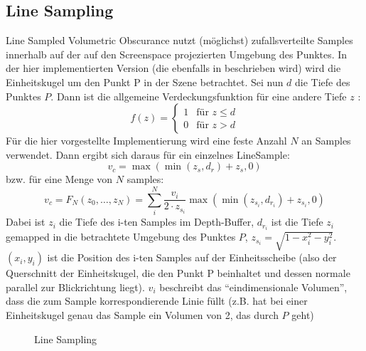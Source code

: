 \documentclass[runningheaders,a4paper]{llncs}
\begin{document}
\subsection{Line Sampling} \label{ssec:LSVO}
Line Sampled Volumetric Obscurance nutzt (möglichst) zufallsverteilte Samples innerhalb auf der auf den
Screenspace projezierten Umgebung des Punktes. In der hier implementierten Version (die ebenfalls in
\cite{voPaper} beschrieben wird) wird die Einheitskugel um den Punkt P in der Szene betrachtet.
Sei nun $d$ die Tiefe des Punktes $P$. Dann ist die allgemeine Verdeckungsfunktion für eine andere Tiefe
$z$ :
$$
f(z) = \begin{cases} 1 &  \text{für } z \leq d \\ 0 & \text{für } z > d \end{cases}
$$
Für die hier vorgestellte Implementierung wird eine feste Anzahl $N$ an Samples verwendet.
Dann ergibt sich daraus für ein einzelnes LineSample:
$$
v_c = \max{(\min{(z_s, d_r)} + z_s, 0)}
$$
bzw. für eine Menge von $N$ samples:
$$
v_c = F_{N}(z_0, \dots, z_N) = \sum_i^N \frac{v_i}{2 \cdot z_{s_i}} \max{(\min{(z_{s_i}, d_{r_i})} + z_{s_i}, 0)}
$$
Dabei ist $z_i$ die Tiefe des i-ten Samples im Depth-Buffer, $d_{r_i}$ ist die Tiefe $z_i$ gemapped in die
betrachtete Umgebung des Punktes $P$, $z_{s_i} = \sqrt{1 - x_i^2 - y_i^2}$. $(x_i, y_i)$ ist die Position des
i-ten Samples auf der Einheitsscheibe (also der Querschnitt der Einheitskugel, die den Punkt P 
beinhaltet und dessen normale parallel zur Blickrichtung liegt). $v_i$ beschreibt das ``eindimensionale
Volumen'', dass die zum Sample korrespondierende Linie füllt (z.B. hat bei einer Einheitskugel genau das Sample
ein Volumen von 2, das durch $P$ geht) \newline

\begin{figure}[H]
	\centering

	
	\label{ref:lineSample}

	\caption{Line Sampling}
\end{figure}
\end{document}
